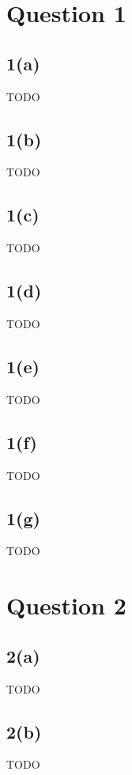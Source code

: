 \documentclass[10pt, a4paper,reqno]{article}
\begin{document}



%
%
\section*{Question 1}

\subsection*{1(a)}
TODO

\subsection*{1(b)}
TODO

\subsection*{1(c)}
TODO

\subsection*{1(d)}
TODO

\subsection*{1(e)}
TODO

\subsection*{1(f)}
TODO

\subsection*{1(g)}
TODO


%
%
\clearpage\section*{Question 2}

\subsection*{2(a)}
TODO

\subsection*{2(b)}
TODO
\end{document}
